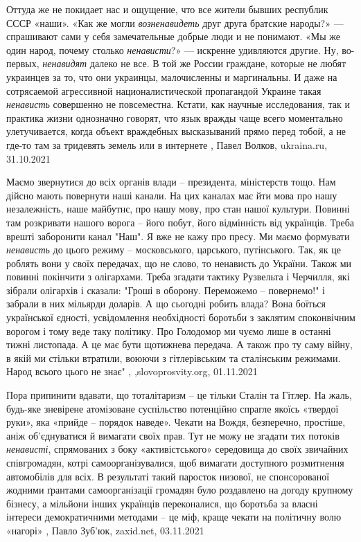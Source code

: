Оттуда же не покидает нас и ощущение, что все жители бывших республик СССР
«наши». «Как же могли \emph{возненавидеть} друг друга братские народы?» —
спрашивают сами у себя замечательные добрые люди и не понимают. «Мы же один
народ, почему столько \emph{ненависти}?» — искренне удивляются другие.  Ну,
во-первых, \emph{ненавидят} далеко не все. В той же России граждане, которые не
любят украинцев за то, что они украинцы, малочисленны и маргинальны. И даже на
сотрясаемой агрессивной националистической пропагандой Украине такая
\emph{ненависть} совершенно не повсеместна. Кстати, как научные исследования,
так и практика жизни однозначно говорят, что язык вражды чаще всего моментально
улетучивается, когда объект враждебных высказываний прямо перед тобой, а не
где-то там за тридевять земель или в интернете
, Павел Волков, ukraina.ru, 31.10.2021

Маємо звернутися до всіх органів влади – президента, міністерств тощо. Нам
дійсно мають повернути наші канали. На цих каналах має йти мова про нашу
незалежність, наше майбутнє, про нашу мову, про стан нашої культури. Повинні
там розкривати нашого ворога – його побут, його відмінність від українців.
Треба врешті заборонити канал "Наш". Я вже не кажу про пресу. Ми маємо
формувати \emph{ненависть} до цього режиму – московського, царського, путінського.
Так, як це роблять вони у своїх передачах, що не слово, то ненависть до
України.  Також ми повинні покінчити з олігархами. Треба згадати тактику
Рузвельта і Черчилля, які зібрали олігархів і сказали: "Гроші в оборону.
Переможемо – повернемо!" і забрали в них мільярди доларів.  А що сьогодні
робить влада? Вона боїться української єдності, усвідомлення необхідності
боротьби з заклятим споконвічним ворогом і тому веде таку політику.  Про
Голодомор ми чуємо лише в останні тижні листопада. А це має бути щотижнева
передача. А також про ту саму війну, в якій ми стільки втратили, воюючи з
гітлерівським та сталінським режимами. Народ всього цього не знає"
, ,slovoprosvity.org, 01.11.2021

Пора припинити вдавати, що тоталітаризм – це тільки Сталін та Гітлер. На жаль,
будь-яке зневірене атомізоване суспільство потенційно спрагле якоїсь «твердої
руки», яка «прийде – порядок наведе». Чекати на Вождя, безперечно, простіше,
аніж об'єднуватися й вимагати своїх прав. Тут не можу не згадати тих потоків
\emph{ненависті}, спрямованих з боку «активістського» середовища до своїх звичайних
співгромадян, котрі самоорганізувалися, щоб вимагати доступного розмитнення
автомобілів для всіх. В результаті такий паросток низової, не спонсорованої
жодними ґрантами самоорганізації громадян було роздавлено на догоду крупному
бізнесу, а мільйони інших українців переконалися, що боротьба за власні
інтереси демократичними методами – це міф, краще чекати на політичну волю
«нагорі»
, Павло Зуб'юк, zaxid.net, 03.11.2021

